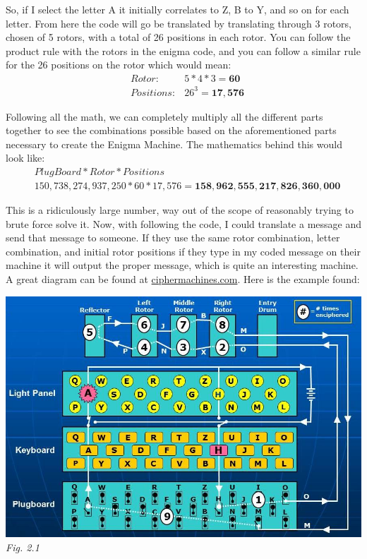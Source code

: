 \documentclass[11pt]{article}
\newcommand\tab[1][0.5cm]{\hspace*{#1}}
\begin{document}
\tab So, if I select the letter A it initially correlates to Z, B to Y, and so on for each letter. From here the code will go be translated by translating through 3 rotors, chosen of 5 rotors, with a total of 26 positions in each rotor. You can follow the product rule with the rotors in the enigma code, and you can follow a similar rule for the 26 positions on the rotor which would mean:
\begin{align*}
	&Rotor: &5*4*3=\bm{60} \\
	&Positions: &26^3=\bm{17,576}
\end{align*}

\tab Following all the math, we can completely multiply all the different parts together to see the combinations possible based on the aforementioned parts necessary to create the Enigma Machine. The mathematics behind this would look like:
\begin{align*}
	&PlugBoard*Rotor*Positions \\
	&150,738,274,937,250*60*17,576=\bm{158,962,555,217,826,360,000}
\end{align*}

\tab This is a ridiculously large number, way out of the scope of reasonably trying to brute force solve it. Now, with following the code, I could translate a message and send that message to someone. If they use the same rotor combination, letter combination, and initial rotor positions if they type in my coded message on their machine it will output the proper message, which is quite an interesting machine. A great diagram can be found at \url{ciphermachines.com}. Here is the example found:

\begin{center}
	\includegraphics[scale=.5]{photos/wiring.png} \\
	\textit{Fig. 2.1}
\end{center}
\end{document}

